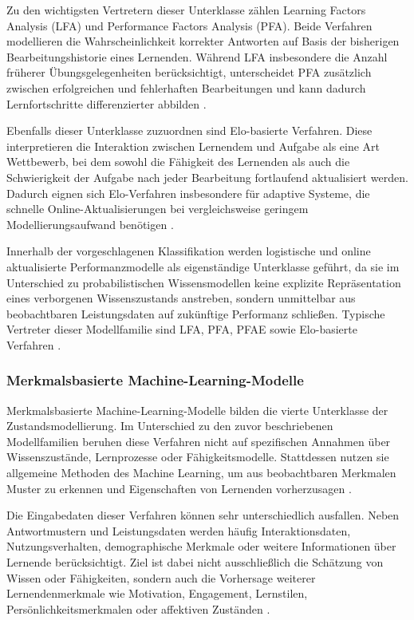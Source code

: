 Zu den wichtigsten Vertretern dieser Unterklasse zählen Learning Factors
Analysis (LFA) und Performance Factors Analysis (PFA). Beide Verfahren
modellieren die Wahrscheinlichkeit korrekter Antworten auf Basis der
bisherigen Bearbeitungshistorie eines Lernenden. Während LFA
insbesondere die Anzahl früherer Übungsgelegenheiten berücksichtigt,
unterscheidet PFA zusätzlich zwischen erfolgreichen und fehlerhaften
Bearbeitungen und kann dadurch Lernfortschritte differenzierter abbilden
\citep{Pelanek2017, Shen2024}.

Ebenfalls dieser Unterklasse zuzuordnen sind Elo-basierte Verfahren.
Diese interpretieren die Interaktion zwischen Lernendem und Aufgabe als
eine Art Wettbewerb, bei dem sowohl die Fähigkeit des Lernenden als auch
die Schwierigkeit der Aufgabe nach jeder Bearbeitung fortlaufend
aktualisiert werden. Dadurch eignen sich Elo-Verfahren insbesondere für
adaptive Systeme, die schnelle Online-Aktualisierungen bei
vergleichsweise geringem Modellierungsaufwand benötigen
\citep{Pelanek2017, Shen2024}.

Innerhalb der vorgeschlagenen Klassifikation werden logistische und
online aktualisierte Performanzmodelle als eigenständige Unterklasse
geführt, da sie im Unterschied zu probabilistischen Wissensmodellen
keine explizite Repräsentation eines verborgenen Wissenszustands
anstreben, sondern unmittelbar aus beobachtbaren Leistungsdaten auf
zukünftige Performanz schließen. Typische Vertreter dieser Modellfamilie
sind LFA, PFA, PFAE sowie Elo-basierte Verfahren
\citep{Pelanek2017, Shen2024}.

\subsubsection{Merkmalsbasierte
Machine-Learning-Modelle}\label{merkmalsbasierte-machine-learning-modelle}

Merkmalsbasierte Machine-Learning-Modelle bilden die vierte Unterklasse
der Zustandsmodellierung. Im Unterschied zu den zuvor beschriebenen
Modellfamilien beruhen diese Verfahren nicht auf spezifischen Annahmen
über Wissenszustände, Lernprozesse oder Fähigkeitsmodelle. Stattdessen
nutzen sie allgemeine Methoden des Machine Learning, um aus
beobachtbaren Merkmalen Muster zu erkennen und Eigenschaften von
Lernenden vorherzusagen \citep{Wang2025, Orji2022}.

Die Eingabedaten dieser Verfahren können sehr unterschiedlich ausfallen.
Neben Antwortmustern und Leistungsdaten werden häufig Interaktionsdaten,
Nutzungsverhalten, demographische Merkmale oder weitere Informationen
über Lernende berücksichtigt. Ziel ist dabei nicht ausschließlich die
Schätzung von Wissen oder Fähigkeiten, sondern auch die Vorhersage
weiterer Lernendenmerkmale wie Motivation, Engagement, Lernstilen,
Persönlichkeitsmerkmalen oder affektiven Zuständen \citep{Orji2022}.

